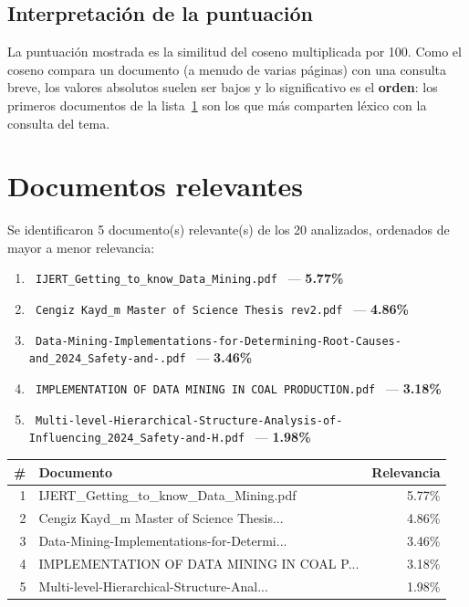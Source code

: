 \documentclass[11pt,a4paper]{article}
\newcommand{\nombrearchivo}[1]{\texttt{#1}}
\newcommand{\pcento}{\%}
\begin{document}
\subsection{Interpretación de la puntuación}

La puntuación mostrada es la similitud del coseno multiplicada por 100. Como
el coseno compara un documento (a menudo de varias páginas) con una consulta
breve, los valores absolutos suelen ser bajos y lo significativo es el
\textbf{orden}: los primeros documentos de la lista~\ref{sec:relevantes} son
los que más comparten léxico con la consulta del tema.

\section{Documentos relevantes}
\label{sec:relevantes}

Se identificaron 5 documento(s) relevante(s) de los
20 analizados, ordenados de mayor a menor relevancia:

\begin{enumerate}
\setlength{\itemsep}{6pt}
\renewcommand{\labelenumi}{\arabic{enumi}.}
  \item \nombrearchivo{ IJERT\_Getting\_to\_know\_Data\_Mining.pdf } --- \textbf{ 5.77\pcento}
  \item \nombrearchivo{ Cengiz Kayd\_m Master of Science Thesis rev2.pdf } --- \textbf{ 4.86\pcento}
  \item \nombrearchivo{ Data-Mining-Implementations-for-Determining-Root-Causes-and\_2024\_Safety-and-.pdf } --- \textbf{ 3.46\pcento}
  \item \nombrearchivo{ IMPLEMENTATION OF DATA MINING IN COAL PRODUCTION.pdf } --- \textbf{ 3.18\pcento}
  \item \nombrearchivo{ Multi-level-Hierarchical-Structure-Analysis-of-Influencing\_2024\_Safety-and-H.pdf } --- \textbf{ 1.98\pcento}
\end{enumerate}

\begin{center}
\begin{tabular}{r p{8.5cm} r}
\hline
\textbf{\#} & \textbf{Documento} & \textbf{Relevancia} \\
\hline
1 & IJERT\_Getting\_to\_know\_Data\_Mining.pdf & 5.77\pcento \\
2 & Cengiz Kayd\_m Master of Science Thesis... & 4.86\pcento \\
3 & Data-Mining-Implementations-for-Determi... & 3.46\pcento \\
4 & IMPLEMENTATION OF DATA MINING IN COAL P... & 3.18\pcento \\
5 & Multi-level-Hierarchical-Structure-Anal... & 1.98\pcento \\
\hline
\end{tabular}
\end{center}
\end{document}
